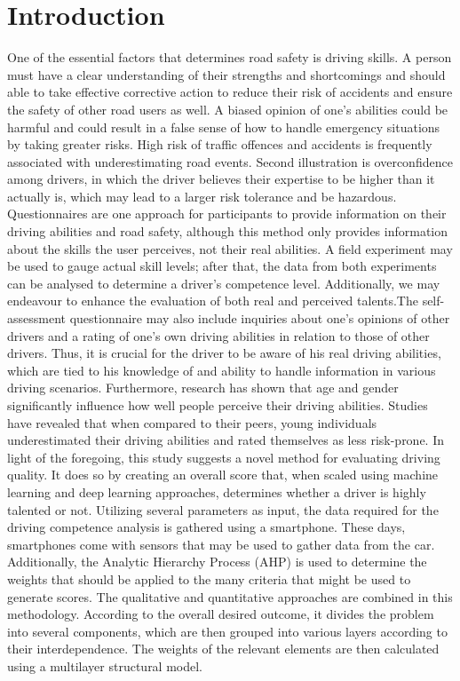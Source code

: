 \documentclass[12pt,letterpaper]{report}
\begin{document}
\chapter{Introduction}
One of the essential factors that determines road safety is driving skills. A person must have a clear understanding of their strengths and shortcomings and should able to take effective corrective action to reduce their risk of accidents and ensure the safety of other road users as well. A biased opinion of one's abilities could be harmful and could result in a false sense of how to handle emergency situations by taking greater risks. High risk of traffic offences and accidents is frequently associated with underestimating road events. Second illustration is overconfidence among drivers, in which the driver believes their expertise to be higher than it actually is, which may lead to a larger risk tolerance and be hazardous. Questionnaires are one approach for participants to provide information on their driving abilities and road safety, although this method only provides information about the skills the user perceives, not their real abilities. A field experiment may be used to gauge actual skill levels; after that, the data from both experiments can be analysed to determine a driver's competence level. Additionally, we may endeavour to enhance the evaluation of both real and perceived talents.The self-assessment questionnaire may also include inquiries about one's opinions of other drivers and a rating of one's own driving abilities in relation to those of other drivers. Thus, it is crucial for the driver to be aware of his real driving abilities, which are tied to his knowledge of and ability to handle information in various driving scenarios. Furthermore, research has shown that age and gender significantly influence how well people perceive their driving abilities. Studies have revealed that when compared to their peers, young individuals underestimated their driving abilities and rated themselves as less risk-prone. In light of the foregoing, this study suggests a novel method for evaluating driving quality. It does so by creating an overall score that, when scaled using machine learning and deep learning approaches, determines whether a driver is highly talented or not. Utilizing several parameters as input, the data required for the driving competence analysis is gathered using a smartphone. These days, smartphones come with sensors that may be used to gather data from the car. Additionally, the Analytic Hierarchy Process (AHP) is used to determine the weights that should be applied to the many criteria that might be used to generate scores. The qualitative and quantitative approaches are combined in this methodology. According to the overall desired outcome, it divides the problem into several components, which are then grouped into various layers according to their interdependence. The weights of the relevant elements are then calculated using a multilayer structural model.\\
\end{document}
